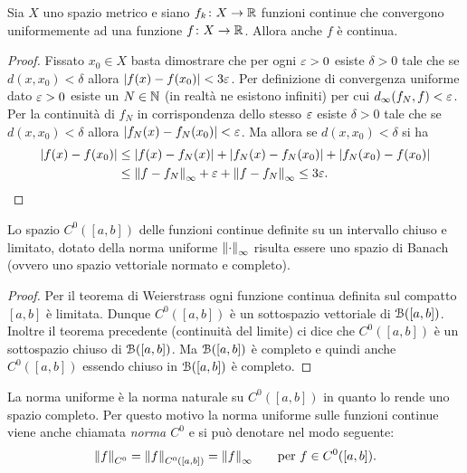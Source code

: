 \begin{theorem}
\mymark{***}%
Sia $X$ uno spazio metrico e siano $f_k\colon X\to {\mathbb R}$
funzioni continue che
convergono uniformemente ad una funzione $f\colon X \to {\mathbb R}$. 
Allora anche $f$ è continua.
\end{theorem}
%
\begin{proof}
\mymark{***}
Fissato $x_0\in X$ basta dimostrare che per ogni $\varepsilon>0$
esiste $\delta>0$ tale che se $d(x,x_0)< \delta$ allora ${\left|f(x)-f(x_0)\right|} < 3 \varepsilon$.
Per definizione di convergenza uniforme dato $\varepsilon>0$
esiste un $N\in {\mathbb N}$ (in realtà ne esistono infiniti) per cui
$d_\infty(f_N,f)< \varepsilon$. Per la continuità di $f_N$ in corrispondenza dello stesso $\varepsilon$ esiste $\delta>0$
tale che se $d(x,x_0) < \delta$ allora ${\left|f_N(x)-f_N(x_0)\right|} < \varepsilon$. Ma allora se $d(x,x_0)<\delta$ si ha
\begin{align*}
{\left|f(x)-f(x_0)\right|}
&\le {\left|f(x) - f_N(x)\right|}
 + {\left|f_N(x)-f_N(x_0)\right|}
 + {\left|f_N(x_0) - f(x_0)\right|} \\
 &\le {\left\Vert f-f_N\right\Vert}_\infty + \varepsilon + {\left\Vert f-f_N\right\Vert}_\infty
  \le 3\varepsilon.
\end{align*}
\end{proof}

\begin{theorem}[completezza di $C^0({[a,b]})$]%
\label{th:C0_completo}
\mymark{***}%
%
%
Lo spazio $C^0([a,b])$ delle funzioni continue definite su un intervallo chiuso e limitato, 
dotato della norma uniforme ${\left\Vert \cdot\right\Vert}_\infty$ risulta essere uno spazio di Banach (ovvero uno spazio vettoriale normato e completo).
\end{theorem}
%
\begin{proof}
Per il teorema di Weierstrass ogni funzione continua definita sul compatto $[a,b]$ è limitata. 
Dunque $C^0([a,b])$ è un sottospazio vettoriale di $\mathcal B([a,b])$. 
Inoltre il teorema precedente (continuità del limite) ci dice che $C^0([a,b])$ è un sottospazio chiuso di $\mathcal B([a,b])$.
Ma $\mathcal B([a,b])$ è completo e quindi anche $C^0([a,b])$ essendo chiuso in $\mathcal B([a,b])$ è completo.
\end{proof}

La norma uniforme è la norma naturale su $C^0([a,b])$ in quanto lo rende uno spazio completo. Per questo motivo la norma uniforme sulle funzioni continue
viene anche chiamata \emph{norma $C^0$} e si
può denotare nel modo seguente:
\[
  {\left\Vert f\right\Vert}_{C^0} = {\left\Vert f\right\Vert}_{C^0([a,b])} = {\left\Vert f\right\Vert}_\infty
  \qquad\text{per $f\in C^0([a,b])$.}
\]


